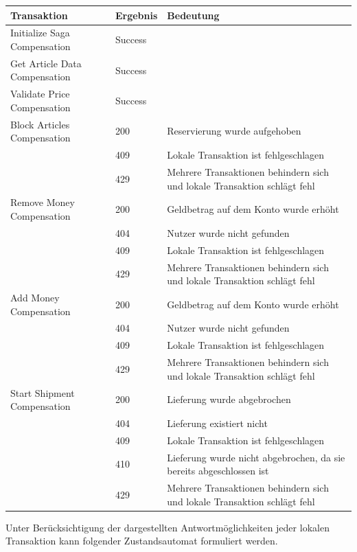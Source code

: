 \begin{center}
	\begin{tabular}[h]{|p{5.5cm}|p{1.5cm}|p{8.5cm}|}
		\hline
		Transaktion 						& Ergebnis 	& Bedeutung \\ \hline
		Initialize Saga Compensation	 	& Success 	& \\ \hline
		Get Article Data Compensation	 	& Success 	& \\ \hline	
		Validate Price Compensation	 		& Success 	& \\ \hline
		Block Articles Compensation	 		& 200	 	& Reservierung wurde aufgehoben \\
											& 409		& Lokale Transaktion ist fehlgeschlagen \\
											& 429 		& Mehrere Transaktionen behindern sich und lokale Transaktion schlägt fehl \\ \hline
		Remove Money Compensation		 		& 200		& Geldbetrag auf dem Konto wurde erhöht \\
											& 404		& Nutzer wurde nicht gefunden \\
											& 409		& Lokale Transaktion ist fehlgeschlagen \\
											& 429		& Mehrere Transaktionen behindern sich und lokale Transaktion schlägt fehl \\ \hline
		Add Money Compensation		 		& 200		& Geldbetrag auf dem Konto wurde erhöht \\
											& 404		& Nutzer wurde nicht gefunden \\
											& 409		& Lokale Transaktion ist fehlgeschlagen \\
											& 429		& Mehrere Transaktionen behindern sich und lokale Transaktion schlägt fehl \\ \hline
		Start Shipment Compensation	 		& 200	 	& Lieferung wurde abgebrochen \\
			 								& 404		& Lieferung existiert nicht \\
											& 409		& Lokale Transaktion ist fehlgeschlagen \\
											& 410		& Lieferung wurde nicht abgebrochen, da sie bereits abgeschlossen ist \\
											& 429		& Mehrere Transaktionen behindern sich und lokale Transaktion schlägt fehl \\ \hline
	\end{tabular}
\end{center}
\FloatBarrier

Unter Berücksichtigung der dargestellten Antwortmöglichkeiten jeder lokalen Transaktion kann folgender Zustandsautomat formuliert werden.

